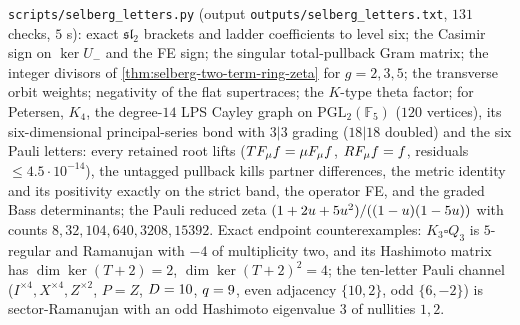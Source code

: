 \begin{numerical}
\label{num:selberg-letters}
\texttt{scripts/selberg\_letters.py} (output \texttt{outputs/selberg\_letters.txt}, $131$ checks,
$5$ s): exact $\mathfrak{sl}_2$ brackets and ladder coefficients to level six; the Casimir sign on
$\ker U_-$ and the FE sign; the singular total-pullback Gram matrix; the integer divisors of
\cref{thm:selberg-two-term-ring-zeta} for $g = 2,3,5$; the transverse orbit weights; negativity
of the flat supertraces; the $K$-type theta factor; for Petersen, $K_4$, the degree-$14$ LPS
Cayley graph on $\mathrm{PGL}_2(\mathbb F_5)$ ($120$ vertices), its six-dimensional principal-series
bond with $3|3$ grading ($18|18$ doubled) and the six Pauli letters: every retained root lifts
($TF_\mu f = \mu F_\mu f$, $RF_\mu f = f$, residuals $\le4.5\cdot10^{-14}$), the untagged pullback
kills partner differences, the metric identity and its positivity exactly on the strict band, the
operator FE, and the graded Bass determinants; the Pauli reduced zeta $(1+2u+5u^2)/((1-u)(1-5u))$
with counts $8,32,104,640,3208,15392$. Exact endpoint counterexamples: $K_3\square Q_3$ is
$5$-regular and Ramanujan with $-4$ of multiplicity two, and its Hashimoto matrix has
$\dim\ker(T+2) = 2$, $\dim\ker(T+2)^2 = 4$; the ten-letter Pauli channel ($I^{\times4},X^{\times4},
Z^{\times2}$, $P = Z$, $D = 10$, $q = 9$, even adjacency $\{10,2\}$, odd $\{6,-2\}$) is
sector-Ramanujan with an odd Hashimoto eigenvalue $3$ of nullities $1,2$.
\end{numerical}
